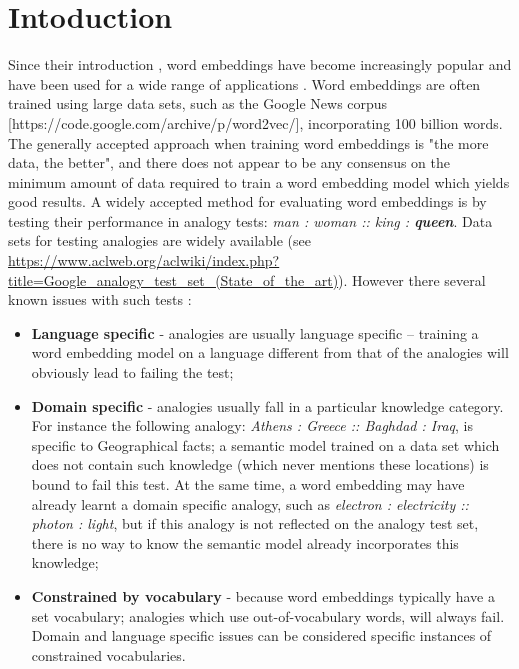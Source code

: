 \documentclass{article} %
\begin{document}
\section{Intoduction}
\label{sec:introduction}
Since their introduction \cite{Mikolov_CS2013}, word embeddings have become increasingly popular and have been used for a wide range of applications \cite{Mikolov_CoRR2013, Kim_CoRR2014, Levy_CNLL2014, Cordeiro_ACL2016, Smith_ICLR2017}. Word embeddings are often trained using large data sets, such as the Google News corpus [https://code.google.com/archive/p/word2vec/], incorporating 100 billion words. The generally accepted approach when training word embeddings is "the more data, the better", and there does not appear to be any consensus on the minimum amount of data required to train a word embedding model which yields good results. A widely accepted method for evaluating word embeddings is by testing their performance in analogy tests: \textit{man : woman :: king : \textbf{queen}}. Data sets for testing analogies are widely available (see 
\url{https://www.aclweb.org/aclwiki/index.php?title=Google_analogy_test_set_(State_of_the_art)}). However there several known issues with such tests \cite{Speer_Blog2016}:

\begin{itemize}
 \item \textbf{Language specific} - analogies are usually language specific -- training a word embedding model on a language different from that of the analogies will obviously lead to failing the test;
 \item \textbf{Domain specific} - analogies usually fall in a particular knowledge category. For instance the following analogy: \textit{Athens : Greece :: Baghdad : Iraq}, is specific to Geographical facts; a semantic model trained on a data set which does not contain such knowledge (which never mentions these locations) is bound to fail this test. At the same time, a word embedding may have already learnt a domain specific analogy, such as \textit{electron : electricity :: photon : light}, but if this analogy is not reflected on the analogy test set, there is no way to know the semantic model already incorporates this knowledge;
 \item \textbf{Constrained by vocabulary} - because word embeddings typically have a set vocabulary; analogies which use out-of-vocabulary words, will always fail. Domain and language specific issues can be considered specific instances of constrained vocabularies.
\end{itemize}
\end{document}

